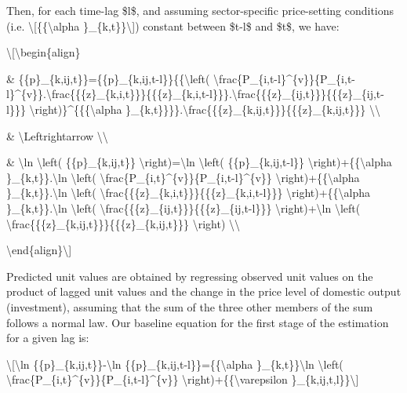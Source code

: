 \documentclass[12pt,twoside,a4paper,notitlepage]{article}
\begin{document}
 Then, for each time-lag \$l\$, and assuming sector-specific price-setting conditions (i.e. \textbackslash [\{\{\textbackslash alpha \}\_\{k,t\}\}\textbackslash ]) constant between \$t-l\$ and \$t\$, we have:

\textbackslash [\textbackslash begin\{align\}

 \& \{\{p\}\_\{k,ij,t\}\}=\{\{p\}\_\{k,ij,t-l\}\}\{\{\textbackslash left( \textbackslash frac\{P\_\{i,t-l\}\textasciicircum{}\{v\}\}\{P\_\{i,t-l\}\textasciicircum{}\{v\}\}.\textbackslash frac\{\{\{z\}\_\{k,i,t\}\}\}\{\{\{z\}\_\{k,i,t-l\}\}\}.\textbackslash frac\{\{\{z\}\_\{ij,t\}\}\}\{\{\{z\}\_\{ij,t-l\}\}\} \textbackslash right)\}\textasciicircum{}\{\{\{\textbackslash alpha \}\_\{k,t\}\}\}\}.\textbackslash frac\{\{\{z\}\_\{k,ij,t\}\}\}\{\{\{z\}\_\{k,ij,t\}\}\} \textbackslash \textbackslash 

 \& \textbackslash Leftrightarrow \textbackslash \textbackslash 

 \& \textbackslash ln \textbackslash left( \{\{p\}\_\{k,ij,t\}\} \textbackslash right)=\textbackslash ln \textbackslash left( \{\{p\}\_\{k,ij,t-l\}\} \textbackslash right)+\{\{\textbackslash alpha \}\_\{k,t\}\}.\textbackslash ln \textbackslash left( \textbackslash frac\{P\_\{i,t\}\textasciicircum{}\{v\}\}\{P\_\{i,t-l\}\textasciicircum{}\{v\}\} \textbackslash right)+\{\{\textbackslash alpha \}\_\{k,t\}\}.\textbackslash ln \textbackslash left( \textbackslash frac\{\{\{z\}\_\{k,i,t\}\}\}\{\{\{z\}\_\{k,i,t-l\}\}\} \textbackslash right)+\{\{\textbackslash alpha \}\_\{k,t\}\}.\textbackslash ln \textbackslash left( \textbackslash frac\{\{\{z\}\_\{ij,t\}\}\}\{\{\{z\}\_\{ij,t-l\}\}\} \textbackslash right)+\textbackslash ln \textbackslash left( \textbackslash frac\{\{\{z\}\_\{k,ij,t\}\}\}\{\{\{z\}\_\{k,ij,t\}\}\} \textbackslash right) \textbackslash \textbackslash 

\textbackslash end\{align\}\textbackslash ]

Predicted unit values are obtained by regressing observed unit values on the product of lagged unit values and the change in the price level of domestic output (investment), assuming that the sum of the three other members of the sum follows a normal law. Our baseline equation for the first stage of the estimation for a given lag is: 

\textbackslash [\textbackslash ln \{\{p\}\_\{k,ij,t\}\}-\textbackslash ln \{\{p\}\_\{k,ij,t-l\}\}=\{\{\textbackslash alpha \}\_\{k,t\}\}\textbackslash ln \textbackslash left( \textbackslash frac\{P\_\{i,t\}\textasciicircum{}\{v\}\}\{P\_\{i,t-l\}\textasciicircum{}\{v\}\} \textbackslash right)+\{\{\textbackslash varepsilon \}\_\{k,ij,t,l\}\}\textbackslash ] \label{ref-009}
\end{document}

